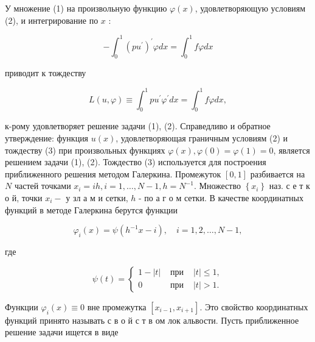 \documentclass[10pt]{article}
\begin{document}
У множение (1) на произвольную функцию $\varphi(x)$, удовлетворяющую условиям (2), и интегрирование по $x$ :



\[

-\int_{0}^{1}\left(p u^{\prime}\right)^{\prime} \varphi d x=\int_{0}^{1} f \varphi d x

\]



приводит к тождеству



\[

L(u, \varphi) \equiv \int_{0}^{1} p u^{\prime} \varphi^{\prime} d x=\int_{0}^{1} f \varphi d x,

\]



к-рому удовлетворяет решение задачи (1), (2). Справедливо и обратное утверждение: функция $u(x)$, удовлетворяющая граничным условиям (2) и тождеству (3) при произвольных функциях $\varphi(x), \varphi(0)=\varphi(1)=0$, является решением задачи (1), (2). Тождество (3) используется для построения приближенного решения методом Галеркина. Промежуток $[0,1]$ разбивается на $N$ частей точками $x_{i}=i h, i=1, \ldots, N-1, h=N^{-1}$. Множество $\left\{x_{i}\right\}$ наз. с е т к о й, точки $x_{i}-$ у зл а м и сетки, $h$ - по а г о м сетки. В качестве координатных функций в методе Галеркина берутся функции



\[

\varphi_{i}(x)=\psi\left(h^{-1} x-i\right), \quad i=1,2, \ldots, N-1,

\]



где



\[

\psi(t)=\left\{\begin{array}{ccc}

1-|t| & \text { при } & |t| \leqslant 1, \\

0 & \text { при } & |t|>1 .

\end{array}\right.

\]



Функции $\varphi_{i}(x) \equiv 0$ вне промежутка $\left[x_{i-1}, x_{i+1}\right]$. Это свойство координатных функций принято называть с в о й с т в ом лок альвости. Пусть приближенное решение задачи ищется в виде
\end{document}
